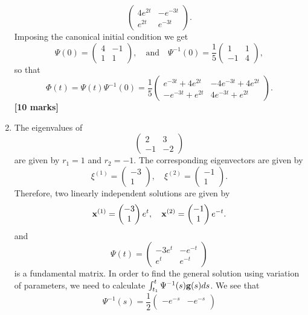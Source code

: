 \documentclass[11pt,a4paper]{article}
\newcommand{\mrk}[1]{\hfill\textbf{[#1 marks]}}
\begin{document}
\begin{enumerate}
$$\begin{pmatrix}
			4e^{2t} & -e^{-3t}\\
			e^{2t} & e^{-3t}
		\end{pmatrix}.
		$$
		Imposing the canonical initial condition we get
		$$
		\Psi(0) =
		\begin{pmatrix}
			4 & -1\\
			1 & 1
		\end{pmatrix},\quad \text{and}\quad \Psi^{-1}(0) = \frac{1}{5}
		\begin{pmatrix}
			1 & 1\\
			-1 & 4
		\end{pmatrix},
		$$
		so that
		$$
		\Phi(t) = \Psi(t)\Psi^{-1}(0) = \frac{1}{5}
		\begin{pmatrix}
			e^{-3t} + 4e^{2t} & -4e^{-3t} + 4e^{2t}\\
			-e^{-3t} + e^{2t} & 4e^{-3t} + e^{2t}
		\end{pmatrix}.
		$$
		\mrk{10}
		\item The eigenvalues of
		$$
		\begin{pmatrix}
			2 & 3\\
			-1 & -2
		\end{pmatrix}
		$$
		are given by $r_1 = 1$ and $r_2 = -1$. The corresponding eigenvectors are given by
		$$
		\xi^{(1)} =
		\begin{pmatrix}
			-3\\
			1
		\end{pmatrix},\quad 
		\xi^{(2)} =
		\begin{pmatrix}
			-1\\
			1
		\end{pmatrix}.
		$$
		Therefore, two linearly independent solutions are given by
		$$
		\vb{x}^{(1)} = 
		\begin{pmatrix}
			-3\\
			1
		\end{pmatrix}e^t,\quad
		\vb{x}^{(2)} =
		\begin{pmatrix}
			-1\\
			1
		\end{pmatrix}e^{-t}.
		$$
		and
		$$
		\Psi(t) =
		\begin{pmatrix}
			-3e^t & -e^{-t}\\
			e^t & e^{-t}
		\end{pmatrix}
		$$
		is a fundamental matrix. In order to find the general solution using variation of parameters, we need to calculate $\int^t_{t_1}\Psi^{-1}(s)\vb{g}(s)ds$. We see that
		$$
		\Psi^{-1}(s) = \frac{1}{2}
		\begin{pmatrix}
			-e^{-s} & -e^{-s}\\

\end{pmatrix}$$
\end{enumerate}
\end{document}
